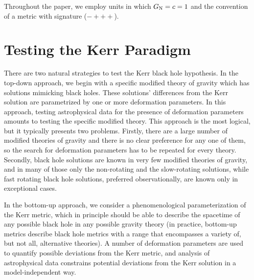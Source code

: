 \documentclass[11pt,a4paper,pdftex]{article}
\begin{document}
Throughout the paper, we employ units in which $G_{\rm N} = c = 1$ and the convention of a metric with signature ($-+++$).






\section{Testing the Kerr Paradigm} \label{kerr}

There are two natural strategies to test the Kerr black hole hypothesis. In the top-down approach, we begin with a specific modified theory of gravity which has solutions mimicking black holes. These solutions' differences from the Kerr solution are parametrized by one or more deformation parameters. In this approach, testing astrophysical data for the presence of deformation parameters amounts to testing the specific modified theory. This approach is the most logical, but it typically presents two problems. Firstly, there are a large number of modified theories of gravity and there is no clear preference for any one of them, so the search for deformation parameters has to be repeated for every theory. Secondly, black hole solutions are known in very few modified theories of gravity, and in many of those only the non-rotating and the slow-rotating solutions, while fast rotating black hole solutions, preferred observationally, are known only in exceptional cases. 


In the bottom-up approach, we consider a phenomenological parameterization of the Kerr metric, which in principle should be able to describe the spacetime of any possible black hole in any possible gravity theory (in practice, bottom-up metrics describe black hole metrics with a range that encompasses a variety of, but not all, alternative theories). A number of deformation parameters are used to quantify possible deviations from the Kerr metric, and analysis of astrophysical data constrains potential deviations from the Kerr solution in a model-independent way. 
\end{document}
